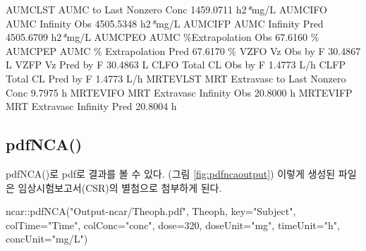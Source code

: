 \documentclass[
  11pt,
  krantz2, a4paper, twoside]{krantz}
\newenvironment{Shaded}{\begin{snugshade}}{\end{snugshade}}
\newcommand{\AttributeTok}[1]{\textcolor[rgb]{0.77,0.63,0.00}{#1}}
\newcommand{\DecValTok}[1]{\textcolor[rgb]{0.00,0.00,0.81}{#1}}
\newcommand{\ExtensionTok}[1]{#1}
\newcommand{\FunctionTok}[1]{\textcolor[rgb]{0.00,0.00,0.00}{#1}}
\newcommand{\NormalTok}[1]{#1}
\newcommand{\PreprocessorTok}[1]{\textcolor[rgb]{0.56,0.35,0.01}{\textit{#1}}}
\newcommand{\SpecialCharTok}[1]{\textcolor[rgb]{0.00,0.00,0.00}{#1}}
\newcommand{\StringTok}[1]{\textcolor[rgb]{0.31,0.60,0.02}{#1}}
\theoremstyle{definition}
\theoremstyle{definition}
\theoremstyle{definition}
\theoremstyle{definition}
\theoremstyle{remark}
\begin{document}
\begin{Shaded}
\begin{Highlighting}[]
\ExtensionTok{AUMCLST}\NormalTok{    AUMC to Last Nonzero Conc                    1459.0711 h2}\PreprocessorTok{*}\NormalTok{mg/L}
\ExtensionTok{AUMCIFO}\NormalTok{    AUMC Infinity Obs                            4505.5348 h2}\PreprocessorTok{*}\NormalTok{mg/L}
\ExtensionTok{AUMCIFP}\NormalTok{    AUMC Infinity Pred                           4505.6709 h2}\PreprocessorTok{*}\NormalTok{mg/L}
\ExtensionTok{AUMCPEO}\NormalTok{    AUMC \%Extrapolation Obs                        67.6160 \%}
\ExtensionTok{AUMCPEP}\NormalTok{    AUMC \% Extrapolation Pred                      67.6170 \%}
\ExtensionTok{VZFO}\NormalTok{       Vz Obs by F                                    30.4867 L}
\ExtensionTok{VZFP}\NormalTok{       Vz Pred by F                                   30.4863 L}
\ExtensionTok{CLFO}\NormalTok{       Total CL Obs by F                               1.4773 L/h}
\ExtensionTok{CLFP}\NormalTok{       Total CL Pred by F                              1.4773 L/h}
\ExtensionTok{MRTEVLST}\NormalTok{   MRT Extravasc to Last Nonzero Conc              9.7975 h}
\ExtensionTok{MRTEVIFO}\NormalTok{   MRT Extravasc Infinity Obs                     20.8000 h}
\ExtensionTok{MRTEVIFP}\NormalTok{   MRT Extravasc Infinity Pred                    20.8004 h}
\end{Highlighting}
\end{Shaded}

\normalsize

\hypertarget{pdfnca}{%
\subsection{pdfNCA()}\label{pdfnca}}

pdfNCA()로 pdf로 결과를 볼 수 있다. (그림 \ref{fig:pdfncaoutput}) 이렇게 생성된 파일은 임상시험보고서(CSR)의 별첨으로 첨부하게 된다.

\begin{Shaded}
\begin{Highlighting}[]
\NormalTok{ncar}\SpecialCharTok{::}\FunctionTok{pdfNCA}\NormalTok{(}\StringTok{"Output{-}ncar/Theoph.pdf"}\NormalTok{, Theoph, }\AttributeTok{key=}\StringTok{"Subject"}\NormalTok{, }
             \AttributeTok{colTime=}\StringTok{"Time"}\NormalTok{,  }\AttributeTok{colConc=}\StringTok{"conc"}\NormalTok{, }\AttributeTok{dose=}\DecValTok{320}\NormalTok{, }\AttributeTok{doseUnit=}\StringTok{"mg"}\NormalTok{, }
             \AttributeTok{timeUnit=}\StringTok{"h"}\NormalTok{, }\AttributeTok{concUnit=}\StringTok{"mg/L"}\NormalTok{)}
\end{Highlighting}
\end{Shaded}
\end{document}
